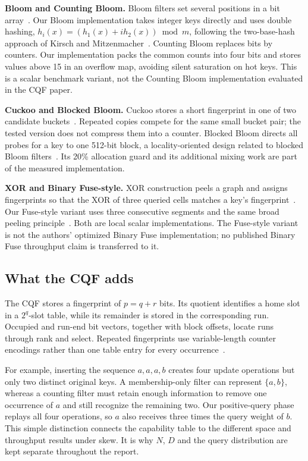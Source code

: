 \textbf{Bloom and Counting Bloom.} Bloom filters set several positions in a bit array~\cite{bloom1970}. Our Bloom implementation takes integer keys directly and uses double hashing, $h_i(x)=(h_1(x)+i h_2(x))\bmod m$, following the two-base-hash approach of Kirsch and Mitzenmacher~\cite{kirsch2006}. Counting Bloom replaces bits by counters. Our implementation packs the common counts into four bits and stores values above 15 in an overflow map, avoiding silent saturation on hot keys. This is a scalar benchmark variant, not the Counting Bloom implementation evaluated in the CQF paper.

\textbf{Cuckoo and Blocked Bloom.} Cuckoo stores a short fingerprint in one of two candidate buckets~\cite{fan2014,cuckoocode}. Repeated copies compete for the same small bucket pair; the tested version does not compress them into a counter. Blocked Bloom directs all probes for a key to one 512-bit block, a locality-oriented design related to blocked Bloom filters~\cite{putze2007}. Its 20\% allocation guard and its additional mixing work are part of the measured implementation.

\textbf{XOR and Binary Fuse-style.} XOR construction peels a graph and assigns fingerprints so that the XOR of three queried cells matches a key's fingerprint~\cite{graf2020}. Our Fuse-style variant uses three consecutive segments and the same broad peeling principle~\cite{graf2022}. Both are local scalar implementations. The Fuse-style variant is not the authors' optimized Binary Fuse implementation; no published Binary Fuse throughput claim is transferred to it.

\subsection{What the CQF adds}
The CQF stores a fingerprint of $p=q+r$ bits. Its quotient identifies a home slot in a $2^q$-slot table, while its remainder is stored in the corresponding run. Occupied and run-end bit vectors, together with block offsets, locate runs through rank and select. Repeated fingerprints use variable-length counter encodings rather than one table entry for every occurrence~\cite{pandey2017,cqfcode}.

For example, inserting the sequence $a,a,a,b$ creates four update operations but only two distinct original keys. A membership-only filter can represent $\{a,b\}$, whereas a counting filter must retain enough information to remove one occurrence of $a$ and still recognize the remaining two. Our positive-query phase replays all four operations, so $a$ also receives three times the query weight of $b$. This simple distinction connects the capability table to the different space and throughput results under skew. It is why $N$, $D$ and the query distribution are kept separate throughout the report.


\clearpage
